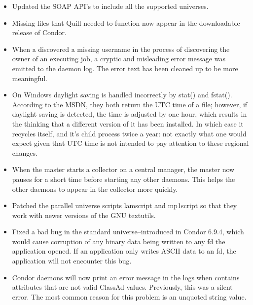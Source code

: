 \begin{itemize}

\item Updated the SOAP API's  to include all the 
      supported universes.

\item Missing files that Quill needed to function now appear in the
downloadable release of Condor.

\item When a  discovered a missing username in the
process of discovering the owner of an executing job, a cryptic and
misleading error message was emitted to the daemon log. The error text
has been cleaned up to be more meaningful.

\item On Windows daylight saving is handled incorrectly by stat() and fstat().
      According to the MSDN, they both return the UTC time of a file; however,
      if daylight saving is detected, the time is adjusted by one hour, which 
      results in the  thinking that a different version of it 
      has been installed.  In which case it recycles itself, and it's child 
      process twice a year: not exactly what one would expect given that UTC
      time is not intended to pay attention to these regional changes.

\item When the master starts a collector on a central manager, the master
	now pauses for a short time before starting any other daemons. This
	helps the other daemons to appear in the collector more quickly. 

\item Patched the parallel universe scripts lamscript and mp1script
so that they work with newer versions of the GNU textutils.

\item Fixed a bad bug in the standard universe--introduced in Condor
6.9.4,  which would cause corruption of any binary data being written to
any fd the application opened. If an application only writes ASCII data
to an fd, the application will not encounter this bug.

\item Condor daemons will now print an error message in the logs when
 contains attributes that are not valid
ClassAd values.  Previously, this was a silent error.  The most common
reason for this problem is an unquoted string value.


\end{itemize}

